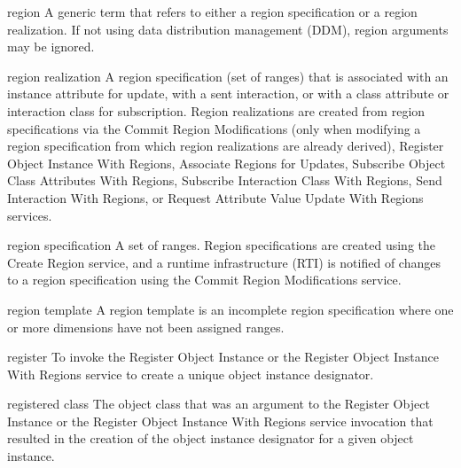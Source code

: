 \begin{definition}{region}
    A generic term that refers to either a region specification or a region realization. If not using data distribution management (DDM), region arguments may be ignored.
\end{definition}


\newpage
\begin{definition}{region realization}
    A region specification (set of ranges) that is associated with an instance attribute for update, with a sent interaction, or with a class attribute or interaction class for subscription. Region realizations are created from region specifications via the Commit Region Modifications (only when modifying a region specification from which region realizations are already derived), Register Object Instance With Regions, Associate Regions for Updates, Subscribe Object Class Attributes With Regions, Subscribe Interaction Class With Regions, Send Interaction With Regions, or Request Attribute Value Update With Regions services.
\end{definition}


\begin{definition}{region specification}
    A set of ranges. Region specifications are created using the Create Region service, and a runtime infrastructure (RTI) is notified of changes to a region specification using the Commit Region Modifications service.
\end{definition}


\begin{definition}{region template}
    A region template is an incomplete region specification where one or more dimensions have not been assigned ranges.
\end{definition}

\begin{definition}{register}
    To invoke the Register Object Instance or the Register Object Instance With Regions service to create a unique object instance designator.
\end{definition}


\begin{definition}{registered class}
    The object class that was an argument to the Register Object Instance or the Register Object Instance With Regions service invocation that resulted in the creation of the object instance designator for a given object instance.
\end{definition}

